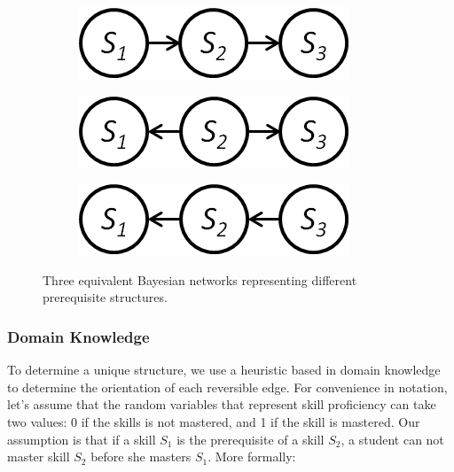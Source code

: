 \documentclass{edm_template}
\begin{document}
	\begin{figure}[!ht]\small
		\centering
		\begin{subfigure}[t]{0.32\linewidth}
			\centering
			\includegraphics[width=0.9\linewidth]{figures/s1s2s3.png}
			\caption{\label{fig:equivnet1}}
		\end{subfigure}
		\begin{subfigure}[t]{0.32\linewidth}
			\centering
			\includegraphics[width=0.9\linewidth]{figures/s2s1s3.png}
			\caption{\label{fig:equivnet2}}
		\end{subfigure}
		\begin{subfigure}[t]{0.32\linewidth}
			\centering
			\includegraphics[width=0.9\linewidth]{figures/s3s2s1.png}
			\caption{\label{fig:equivnet3}}			
		\end{subfigure}		
		\caption{Three equivalent Bayesian networks representing different prerequisite structures.\label{fig:equivnets} }
	\end{figure}
	
	
\subsubsection{Domain Knowledge}
\label{sec:usedomain}
To determine a unique structure, we use  a heuristic based in domain knowledge to determine the orientation of each reversible edge.
For  convenience in notation, let's assume that the random variables that represent skill proficiency can take two values: 0 if the skills is not mastered, and 1 if the skill is mastered.
Our assumption is that if a skill $S_1$ is the prerequisite of a skill $S_2$, a student can not master skill $S_2$ before she masters $S_1$.
More formally:
\end{document}

